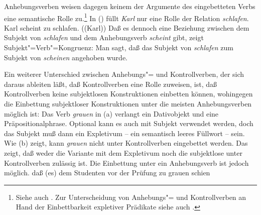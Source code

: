 Anhebungsverben weisen dagegen keinem der Argumente des eingebetteten Verbs eine
semantische Rolle zu.\footnote{
        Siehe auch .
        Zur Unterscheidung von Anhebungs"= und Kontrollverben an Hand
        der Einbettbarkeit expletiver Prädikate siehe auch
        .
}
In () füllt \emph{Karl} nur eine Rolle der Relation \emph{schlafen}.
\eal
\ex Karl scheint zu schlafen.
\ex {}((Karl))
\zl
Daß es dennoch eine Beziehung zwischen dem Subjekt von \emph{schlafen} und dem Anhebungsverb
\emph{scheint} gibt, zeigt Subjekt"=Verb"=Kongruenz:
\eal
{}
\zl
Man sagt, daß das Subjekt von \emph{schlafen} zum Subjekt von \emph{scheinen} angehoben wurde.

Ein weiterer Unterschied zwischen Anhebungs"= und Kontrollverben, der sich daraus ableiten läßt, daß
Kontrollverben eine Rolle zuweisen, ist, daß Kontrollverben keine subjektlosen Konstruktionen einbetten
können, wohingegen die Einbettung subjektloser Konstruktionen unter die meisten Anhebungsverben
möglich ist:
\eal
{}
\zl
Das Verb \emph{grauen} in (a) verlangt ein Dativobjekt und eine Präpositionalphrase.
Optional kann es auch mit Subjekt verwendet werden, doch das Subjekt muß dann ein Expletivum -- ein semantisch
leeres Füllwort -- sein. Wie (b) zeigt, kann \emph{grauen} nicht unter Kontrollverben eingebettet werden.
Das zeigt, daß weder die Variante mit dem Expletivum noch die subjektlose unter Kontrollverben
zulässig ist. Die Einbettung unter ein Anhebungsverb ist jedoch möglich. 
\ea
daß (es) dem Studenten vor der Prüfung zu grauen schien
\z

